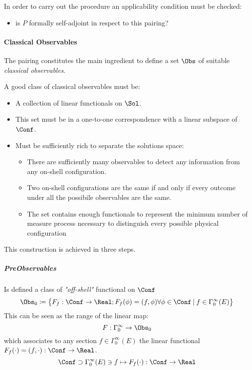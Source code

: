 \documentclass[Main]{subfiles}
\begin{document}
   				In order to carry out the procedure an applicability condition must be checked:
   				\begin{itemize}
   					\item  is $P$ formally self-adjoint in respect to this pairing?
   				\end{itemize}
   				
   				   						 

   					
   		\paragraph{Classical Observables}
   		The pairing constitutes the main ingredient to define a set $\Obs$ of suitable \emph{classical observables}.
   		\begin{observation}
   			A good class of classical observables must be:
   			\begin{itemize}
   				\item A collection of  linear functionals on $\Sol$.
   				\item This set must be in a one-to-one correspondence  with a linear subspace of $\Conf$.
   				\item Must be sufficiently rich to separate the solutions space:
   					\begin{itemize}
   						\item There are sufficiently many observables to detect any information from any on-shell configuration.
   						\item Two on-shell configurations are the same if and only if every outcome under all the possibile observables are the same.
   						\item The set contains enough functionals to represent the minimum number of measure process necessary to distinguish every possible physical configuration
   					\end{itemize}
   			\end{itemize}
   		\end{observation}
   		This construction is achieved in three steps.
   		
 			\subparagraph{PreObservables}
 				Is defined a class of \emph{"off-shell"} functional on $\Conf$
   							\begin{displaymath}
   								\Obs_0 \coloneqq \big\{ F_f: \Conf \rightarrow \Real ;  F_f(\phi)=( f, \phi) \forall \phi \in \Conf \:\vert
   								\:  f \in \Gamma_0^\infty(E)	\big\}
   							\end{displaymath}
   				This can be seen as the range of the linear map:
   				\begin{displaymath}
   					F: \Gamma_0^\infty \rightarrow \Obs_0
  	 			\end{displaymath}
   				which associates to any section $f\in \Gamma_0^\infty(E)$ the linear functional 
   				$F_f(\cdot) = (f,\cdot) :\Conf \rightarrow \Real$.
  	 			\begin{displaymath}
   					\Conf 	\supset \Gamma^\infty_0(E) \ni f \mapsto F_f(\cdot):\Conf \rightarrow \Real
   				\end{displaymath}			
			
\end{document}
